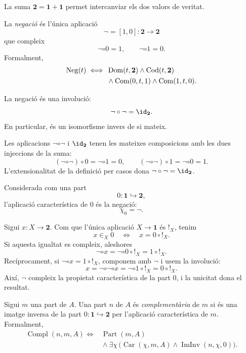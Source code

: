La suma \(\mathbf2=\mathbf1+\mathbf1\) permet intercanviar els dos
valors de veritat.

\begin{definicio}[Negació]\label{def:negacio}
La \emph{negació} és l'única aplicació
\[
\neg=[1,0]:\mathbf2\to\mathbf2
\]
que compleix
\[
\neg\circ0=1,
\qquad
\neg\circ1=0.
\]
Formalment,
\[
\begin{aligned}
\operatorname{Neg}(t)
\iff{}&
\operatorname{Dom}(t,\mathbf2)\land\operatorname{Cod}(t,\mathbf2)
\\
&{}\land\operatorname{Com}(0,t,1)
\land\operatorname{Com}(1,t,0).
\end{aligned}
\]
\end{definicio}

\begin{proposicio}\label{prop:negacio-involutiva}
La negació és una involució:
\[
\neg\circ\neg=\id_{\mathbf2}.
\]
En particular, és un isomorfisme invers de si mateix.
\end{proposicio}

\begin{prova}
Les aplicacions \(\neg\circ\neg\) i \(\id_{\mathbf2}\) tenen les
mateixes composicions amb les dues injeccions de la suma:
\[
(\neg\circ\neg)\circ0=\neg\circ1=0,
\qquad
(\neg\circ\neg)\circ1=\neg\circ0=1.
\]
L'extensionalitat de la definició per casos dona
\(\neg\circ\neg=\id_{\mathbf2}\).
\end{prova}

\begin{proposicio}\label{prop:caracteristica-zero}
Considerada com una part
\[
0:\mathbf1\hookrightarrow\mathbf2,
\]
l'aplicació característica de \(0\) és la negació:
\[
\chi_0=\neg.
\]
\end{proposicio}

\begin{prova}
Sigui \(x:X\to\mathbf2\). Com que l'única aplicació
\(X\to\mathbf1\) és \({!}_X\), tenim
\[
x\in_X0
\quad\Longleftrightarrow\quad
x=0\circ {!}_X.
\]
Si aquesta igualtat es compleix, aleshores
\[
\neg\circ x
=\neg\circ0\circ {!}_X
=1\circ {!}_X.
\]
Recíprocament, si \(\neg\circ x=1\circ {!}_X\), componem amb
\(\neg\) i usem la involució:
\[
x
=\neg\circ\neg\circ x
=\neg\circ1\circ {!}_X
=0\circ {!}_X.
\]
Així, \(\neg\) compleix la propietat característica de la part
\(0\), i la unicitat dona el resultat.
\end{prova}

\begin{definicio}\label{def:complementaria}
Sigui \(m\) una part de \(A\). Una part \(n\) de \(A\) és
\emph{complementària} de \(m\) si és una imatge inversa de la part
\(0:\mathbf1\hookrightarrow\mathbf2\) per l'aplicació característica
de \(m\). Formalment,
\[
\begin{aligned}
\operatorname{Compl}(n,m,A)
\iff{}&
\operatorname{Part}(m,A)
\\
&{}\land
\exists\chi\,
\bigl(
\operatorname{Car}(\chi,m,A)
\land\operatorname{ImInv}(n,\chi,0)
\bigr).
\end{aligned}
\]
\end{definicio}

